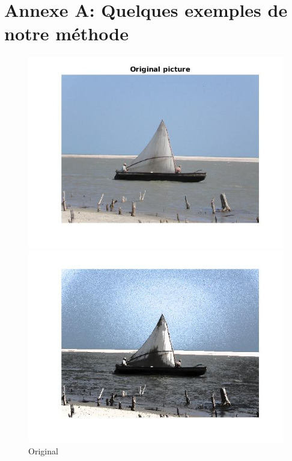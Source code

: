 \documentclass{article}
\begin{document}



\newpage
\section*{Annexe A: Quelques exemples de notre méthode}

\begin{figure}[h]
\centering
\begin{minipage}{0.33\textwidth}
\centering
\includegraphics[width=1\textwidth]{images/boat_conc_depart.jpg}
\caption{Original}
\end{minipage}%
\begin{minipage}{0.33\textwidth}
\centering
\includegraphics[width=1\textwidth]{images/boat_conc_inter.jpg}

\end{minipage}
\end{figure}
\end{document}
